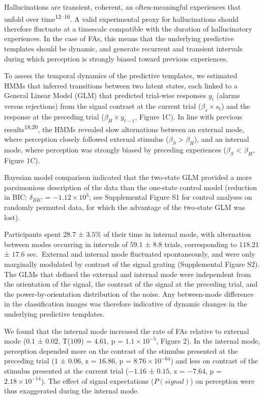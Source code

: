\documentclass[
]{article}
\begin{document}
Hallucinations are transient, coherent, an often-meaningful experiences
that unfold over time\textsuperscript{12--16}. A valid experimental
proxy for hallucinations should therefore fluctuate at a timescale
compatible with the duration of hallucinatory experiences. In the case
of FAs, this means that the underlying predictive templates should be
dynamic, and generate recurrent and transient intervals during which
perception is strongly biased toward previous experiences.

To assess the temporal dynamics of the predictive templates, we
estimated HMMs that inferred transitions between two latent states, each
linked to a General Linear Model (GLM) that predicted trial-wise
responses \(y_t\) (alarms versus rejections) from the signal contrast at
the current trial (\(\beta_s \times s_t\)) and the response at the
preceding trial (\(\beta_H \times y_{t-1}\), Figure 1C). In line with
previous results\textsuperscript{18,20}, the HMMs revealed slow
alternations between an external mode, where perception closely followed
external stimulus (\(\beta_S > \beta_H\)), and an internal mode, where
perception was strongly biased by preceding experiences (\(\beta_S\)
\textless{} \(\beta_H\), Figure 1C).

Bayesian model comparison indicated that the two-state GLM provided a
more parsimonious description of the data than the one-state control
model (reduction in BIC: \(\delta_{BIC}\) =
\(\ensuremath{-1.12\times 10^{3}}\); see Supplemental Figure S1 for
control analyses on randomly permuted data, for which the advantage of
the two-state GLM was lost).

Participants spent \(28.7\) ± \(3.5\)\% of their time in internal mode,
with alternation between modes occurring in intervals of \(59.1\) ±
\(8.8\) trials, corresponding to \(118.21\) ± \(17.6\) sec.~External and
internal mode fluctuated spontaneously, and were only marginally
modulated by contrast of the signal grating (Supplemental Figure S2).
The GLMs that defined the external and internal mode were independent
from the orientation of the signal, the contrast of the signal at the
preceding trial, and the power-by-orientation distribution of the noise.
Any between-mode difference in the classification images was therefore
indicative of dynamic changes in the underlying predictive templates.

We found that the internal mode increased the rate of FAs relative to
external mode (\(0.1\) ± \(0.02\), T(\(109\)) = \(4.61\), p =
\(\ensuremath{1.1\times 10^{-5}}\), Figure 2). In the internal mode,
perception depended more on the contrast of the stimulus presented at
the preceding trial (\(1\) ± \(0.06\), z = \(16.86\), p =
\(\ensuremath{8.76\times 10^{-64}}\)) and less on contrast of the
stimulus presented at the current trial (\(-1.16\) ± \(0.15\), z =
\(-7.64\), p = \(\ensuremath{2.18\times 10^{-14}}\)). The effect of
signal expectations (\(P(signal)\)) on perception were thus exaggerated
during the internal mode.
\end{document}
